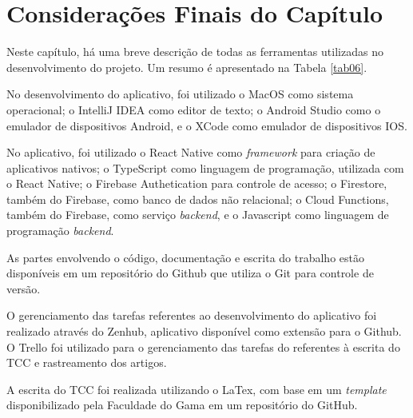 \section{Considerações Finais do Capítulo}


Neste capítulo, há uma breve descrição de todas as ferramentas  
utilizadas no desenvolvimento do projeto. Um resumo é apresentado na Tabela \ref{tab06}.

No desenvolvimento do aplicativo, foi utilizado o MacOS como sistema 
operacional; o IntelliJ IDEA como editor de texto; o Android Studio como 
o emulador de dispositivos Android, e o XCode como emulador de dispositivos IOS. 

No aplicativo, foi utilizado o React Native 
como \emph{framework} para criação de aplicativos nativos; o TypeScript como linguagem 
de programação, utilizada com o React Native; o Firebase Authetication para controle de acesso; 
o Firestore, também do Firebase, como banco de dados não relacional; o Cloud Functions, também do Firebase,
como serviço \emph{backend}, e o Javascript 
como linguagem de programação \emph{backend}.

As partes envolvendo o código, documentação e escrita do trabalho estão disponíveis 
em um repositório do Github que utiliza o Git para controle de versão.

O gerenciamento das tarefas referentes ao desenvolvimento do aplicativo foi realizado através do Zenhub, 
aplicativo disponível como extensão para o Github. O 
Trello foi utilizado para o gerenciamento das tarefas do referentes à escrita do TCC e 
rastreamento dos artigos. 

A escrita do TCC foi realizada utilizando o LaTex, com base em um \emph{template} 
disponibilizado pela Faculdade do Gama em um repositório do GitHub. 


